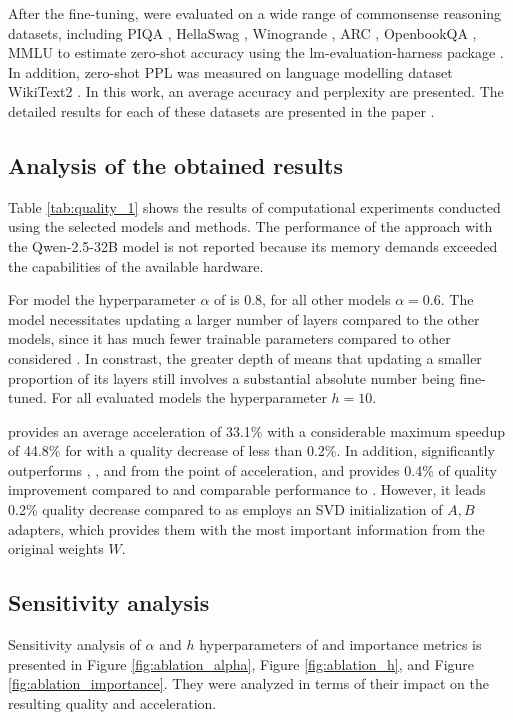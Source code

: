 After the fine-tuning, \llms{} were evaluated on a wide range of commonsense reasoning datasets, including PIQA \cite{piqa}, HellaSwag \cite{hellaswag}, Winogrande \cite{winogrande}, ARC \cite{arc}, OpenbookQA \cite{openbookqa}, MMLU \cite{mmlu} to estimate zero-shot accuracy using the lm-evaluation-harness package \cite{lm_eval}. In addition, zero-shot PPL was measured on language modelling dataset WikiText2 \cite{wikitext}. In this work, an average accuracy and perplexity are presented. The detailed results for each of these datasets are presented in the paper \cite{Demidovskij2025}.

\subsection{Analysis of the obtained results}
Table \ref{tab:quality_1} shows the results of computational experiments conducted using the selected models and methods. The performance of the \dora{} approach with the Qwen-2.5-32B model is not reported because its memory demands exceeded the capabilities of the available hardware.

For \gpt{} model the hyperparameter \(\alpha\) of \ourmethodshort{} is 0.8, for all other models \(\alpha = 0.6\). The \gpt{} model necessitates updating a larger number of layers compared to the other models, since it has much fewer trainable parameters compared to other considered \llms{}. In constrast, the greater depth of \llm{} means that updating a smaller proportion of its layers still involves a substantial absolute number being fine-tuned. For all evaluated models the hyperparameter \(h = 10\).

\ourmethodshort{} provides an average acceleration of 33.1\%
with a considerable maximum speedup of 44.8\% for \llamaTwoBig{}
with a quality decrease of less than 0.2\%.  In addition, \ourmethodshort{} significantly outperforms \pissa{}, \dora{}, and \adalora{} from the point of acceleration, and provides 0.4\% of quality improvement compared to \textit{\adalora{}} and comparable performance to \textit{\dora{}}. However, it leads 0.2\% quality decrease compared to \pissa{} as \pissa{} employs an SVD initialization
of \lora{} \(A, B\) adapters, which provides them with the most important information from the original weights \(W\).

\subsection{Sensitivity analysis}
    Sensitivity analysis of \(\alpha\) and \(h\) hyperparameters of \ourmethodshort{} and importance metrics is presented in Figure \ref{fig:ablation_alpha}, Figure \ref{fig:ablation_h}, and Figure \ref{fig:ablation_importance}. They were analyzed in terms of their impact on the resulting quality and acceleration.
